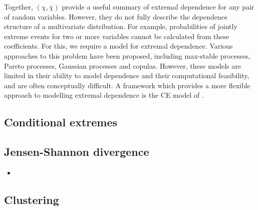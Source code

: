 \documentclass{article}
\numberwithin{equation}{section}
\begin{document}
Together, $(\chi, \bar{\chi})$ provide a useful summary of extremal dependence for any pair of random variables.
However, they do not fully describe the dependence structure of a multivariate distribution.
For example, probabilities of jointly extreme events for two or more variables cannot be calculated from these coefficients.
For this, we require a model for extremal dependence.
Various approaches to this problem have been proposed, including max-stable processes, Pareto processes, Gaussian processes and copulas.
However, these models are limited in their ability to model dependence and their computational feasibility, and are often conceptually difficult. 
A framework which provides a more flexible approach to modelling extremal dependence is the CE model of \citet{Heffernan2004}.

\subsection{Conditional extremes}


\subsection{Jensen-Shannon divergence}


\begin{itemize}
  \item 
\end{itemize}

\subsection{Clustering}


\begin{itemize}
\end{itemize}
\end{document}
